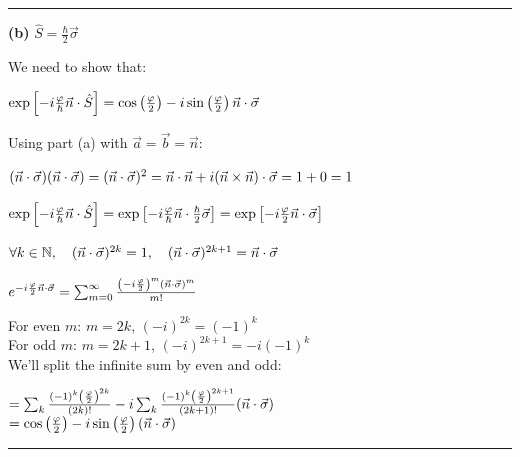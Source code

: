 \documentclass[14pt]{extarticle}
\makeatletter
\newenvironment{lefteqs}{%
    \begin{flushleft}%
    \renewcommand{\arraystretch}{1.3}%
    $\begin{array}{@{}l@{}}%
}{%
    \end{array}$%
    \end{flushleft}%
}
\makeatother
\begin{document}
\hrule
\vspace{2em}

\textbf{(b)} \quad $\hat{S} = \frac{\hbar}{2} \vec{\sigma}$

We need to show that:
\begin{lefteqs}
    \exp\left[ -i \frac{\varphi}{\hbar} \vec{n} \cdot \hat{S} \right] = \cos\left(\frac{\varphi}{2}\right) - i \sin\left(\frac{\varphi}{2}\right) \vec{n} \cdot \vec{\sigma}
\end{lefteqs}
Using part (a) with $\vec{a} = \vec{b} = \vec{n}$:
\begin{lefteqs}
    (\vec{n} \cdot \vec{\sigma})(\vec{n} \cdot \vec{\sigma}) = (\vec{n} \cdot \vec{\sigma})^2 = \vec{n} \cdot \vec{n} + i (\vec{n} \times \vec{n}) \cdot \vec{\sigma} = 1 + 0 = 1
\end{lefteqs}
\begin{lefteqs}
    \exp\left[ -i \frac{\varphi}{\hbar} \vec{n} \cdot \hat{S} \right] = \exp\left[ -i \frac{\varphi}{\hbar} \vec{n} \cdot \frac{\hbar}{2} \vec{\sigma} \right] = \exp\left[ -i \frac{\varphi}{2} \vec{n} \cdot \vec{\sigma} \right]
\end{lefteqs}
\begin{lefteqs}
    \forall k \in \mathbb{N}, \quad (\vec{n} \cdot \vec{\sigma})^{2k} = 1, \quad (\vec{n} \cdot \vec{\sigma})^{2k+1} = \vec{n} \cdot \vec{\sigma}
\end{lefteqs}
\begin{lefteqs}
    e^{-i \frac{\varphi}{2} \vec{n} \cdot \vec{\sigma}} = \sum_{m=0}^{\infty} \frac{\left(-i \frac{\varphi}{2}\right)^m (\vec{n} \cdot \vec{\sigma})^m}{m!}
\end{lefteqs}
For even $m$: $m = 2k$, $(-i)^{2k} = (-1)^k$ \\
For odd $m$: $m = 2k+1$, $(-i)^{2k+1} = -i(-1)^k$ \\
We'll split the infinite sum by even and odd:
\begin{lefteqs}
    = \sum_k \frac{(-1)^k \left(\frac{\varphi}{2}\right)^{2k}}{(2k)!} - i \sum_k \frac{(-1)^k \left(\frac{\varphi}{2}\right)^{2k+1}}{(2k+1)!} (\vec{n} \cdot \vec{\sigma}) \\
    = \cos\left(\frac{\varphi}{2}\right) - i \sin\left(\frac{\varphi}{2}\right) (\vec{n} \cdot \vec{\sigma})
\end{lefteqs}

\hrule
\vspace{2em}
\end{document}
